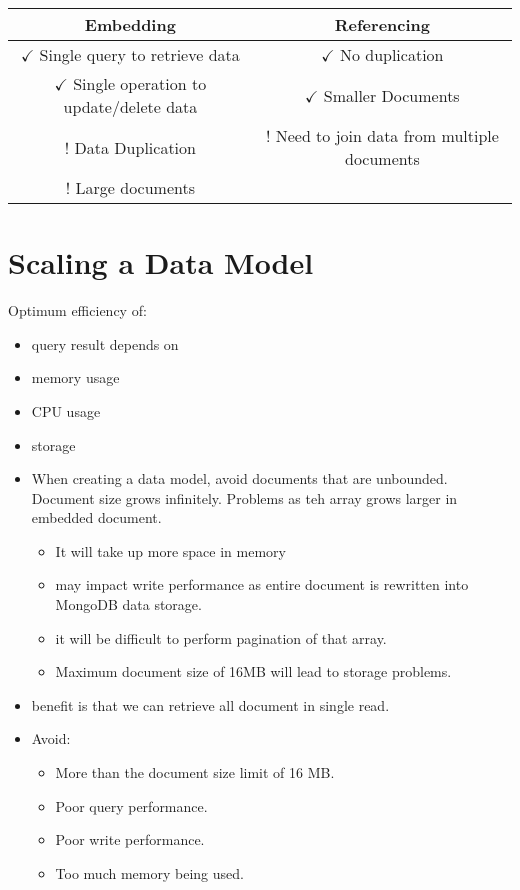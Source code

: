 \documentclass[../main.tex]{subfiles}
\begin{document}
\begin{tabular}{|c|c|}
\toprule
\textbf{Embedding} & \textbf{Referencing}  \\ 
\midrule
$\checkmark$ Single query to retrieve data  & $\checkmark$ No duplication   \\ \hline
$\checkmark$ Single operation to update/delete data  & $\checkmark$ Smaller Documents   \\ \hline
! Data Duplication  & ! Need to join data from multiple documents  \\ \hline
! Large documents  &  \\ 
\bottomrule
\end{tabular}

\section{Scaling a Data Model}
Optimum efficiency of: 
\begin{itemize}
	\item query result depends on 
	\item memory usage
	\item \gls{CPU} usage 
	\item storage
\end{itemize}

\begin{itemize}
	\item When creating a data model, avoid documents that are unbounded. Document size grows infinitely.
		Problems as teh array grows larger in embedded document.
		\begin{itemize}
			\item It will take up more space in memory 
			\item may impact write performance as entire document is rewritten into MongoDB data storage.
			\item it will be difficult to perform pagination of that array.
			\item Maximum document size of 16MB will lead to storage problems.
		\end{itemize}
	\item benefit is that we can retrieve all document in single read.
	\item Avoid: 
		\begin{itemize}
			\item More than the document size limit of 16 MB.\@
			\item Poor query performance.
			\item Poor write performance.
			\item Too much memory being used.
		\end{itemize}
\end{itemize}
\end{document}

